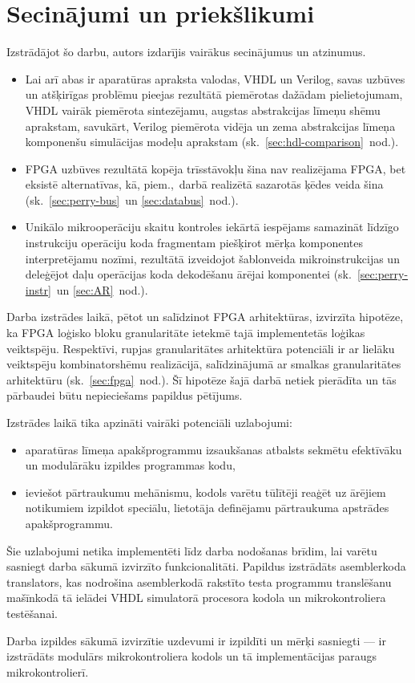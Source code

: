\section*{Secinājumi un priekšlikumi}%
Izstrādājot šo darbu, autors izdarījis vairākus secinājumus un atzinumus.
\begin{itemize}
	\item Lai arī abas ir aparatūras apraksta valodas, VHDL un Verilog,
		savas uzbūves un atšķirīgas problēmu pieejas rezultātā piemērotas
		dažādam pielietojumam, VHDL vairāk piemērota sintezējamu, augstas
		abstrakcijas līmeņu shēmu aprakstam, savukārt, Verilog piemērota
		vidēja un zema abstrakcijas līmeņa komponenšu 
		simulācijas modeļu aprakstam (sk.~\ref{sec:hdl-comparison}~nod.).
	\item FPGA uzbūves rezultātā kopēja trīsstāvokļu šina nav realizējama
		FPGA, bet eksistē alternatīvas, kā, piem.,~darbā realizētā sazarotās
		ķēdes veida šina (sk.~\ref{sec:perry-bus}~un \ref{sec:databus}~nod.).
	\item Unikālo mikrooperāciju skaitu kontroles iekārtā iespējams samazināt
		līdzīgo instrukciju operāciju koda fragmentam piešķirot
		mērķa komponentes interpretējamu nozīmi, rezultātā izveidojot šablonveida
		mikroinstrukcijas un deleģējot daļu operācijas koda dekodēšanu ārējai
		komponentei (sk.~\ref{sec:perry-instr}~un \ref{sec:AR}~nod.).
\end{itemize}

Darba izstrādes laikā, pētot un salīdzinot FPGA arhitektūras, 
izvirzīta hipotēze, ka
 FPGA loģisko bloku granularitāte ietekmē tajā implementetās
loģikas veiktspēju. Respektīvi, rupjas granularitātes 
arhitektūra potenciāli ir ar lielāku veiktspēju kombinatorshēmu realizācijā,
salīdzinājumā ar smalkas granularitātes arhitektūru (sk.~\ref{sec:fpga}~nod.).
Šī hipotēze šajā darbā netiek pierādīta un
tās pārbaudei būtu nepieciešams papildus pētījums.

Izstrādes laikā tika apzināti
vairāki potenciāli uzlabojumi:
\begin{itemize}
	\item aparatūras līmeņa apakšprogrammu izsaukšanas atbalsts
		sekmētu efektīvāku un modulārāku izpildes programmas kodu,
	\item ieviešot pārtraukumu mehānismu, kodols varētu tūlītēji reaģēt
		uz ārējiem notikumiem 
		izpildot speciālu, lietotāja definējamu pārtraukuma apstrādes apakšprogrammu.
\end{itemize}

Šie uzlabojumi netika implementēti līdz darba nodošanas brīdim,
lai varētu sasniegt darba sākumā izvirzīto funkcionalitāti.
Papildus izstrādāts asemblerkoda translators, kas nodrošina asemblerkodā
rakstīto testa programmu translēšanu mašīnkodā tā ielādei VHDL simulatorā
procesora kodola un mikrokontroliera testēšanai.

Darba izpildes sākumā izvirzītie uzdevumi ir izpildīti un mērķi sasniegti
--- ir izstrādāts modulārs mikrokontroliera kodols un tā implementācijas
paraugs mikrokontrolierī.




